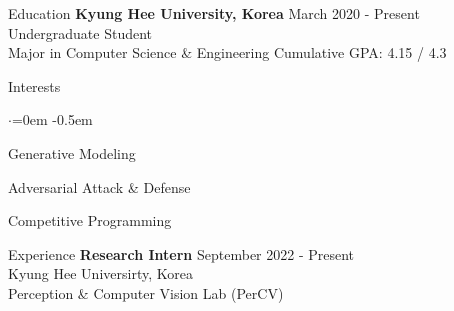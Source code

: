 \documentclass{resume}
\begin{document}
  \begin{rSection}{Education}
    {\bf Kyung Hee University, Korea } \hfill {March 2020 - Present} \\ 
    { Undergraduate Student } \\
    { Major in Computer Science \& Engineering \hfill Cumulative GPA: 4.15 / 4.3 }
  \end{rSection}
  
  \begin{rSection}{Interests}
    \begin{list}{$\cdot$}{\leftmargin=0em}
      \itemsep -0.5em
        \item Generative Modeling
        \item Adversarial Attack \& Defense
        \item Competitive Programming
    \end{list}
  \end{rSection}

  \begin{rSection}{Experience}
    {\bf Research Intern } \hfill {September 2022 - Present} \\ 
    { Kyung Hee Universirty, Korea } \\
    { Perception \& Computer Vision Lab (PerCV) }
  \end{rSection}
\end{document}
